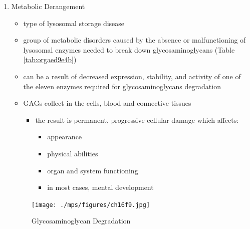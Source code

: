 \documentclass{scrartcl}
\begin{document}
\begin{enumerate}
\item Metabolic Derangement
\label{sec:orgbc35af7}
\begin{itemize}
\item type of lysosomal storage disease
\item group of metabolic disorders caused by the absence or malfunctioning
of lysosomal enzymes needed to break down glycosaminoglycans (Table \ref{tab:orgaed9e4b})
\item can be a result of decreased expression, stability, and activity of
one of the eleven enzymes required for glycosaminoglycans
degradation
\item GAGs collect in the cells, blood and connective tissues
\begin{itemize}
\item the result is permanent, progressive cellular damage which affects:
\begin{itemize}
\item appearance
\item physical abilities
\item organ and system functioning
\item in most cases, mental development
\end{itemize}
\end{itemize}
\end{itemize}

\begin{figure}[htbp]
\centering
\texttt{[image: ./mps/figures/ch16f9.jpg]}
\caption[Glycosaminoglycan Degradation]{\label{fig:org8f3ac2e}
Glycosaminoglycan Degradation}
\end{figure}


\end{enumerate}
\end{document}

